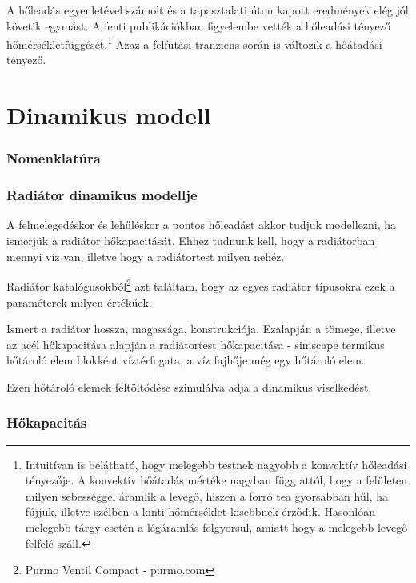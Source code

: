A hőleadás egyenletével számolt és a tapasztalati úton kapott eredmények elég jól követik egymást.
A fenti publikációkban figyelembe vették a hőleadási tényező hőmérsékletfüggését.\footnote{Intuitívan is belátható, hogy melegebb testnek nagyobb a konvektív hőleadási tényezője. A konvektív hőátadás mértéke nagyban függ attól, hogy a felületen milyen sebességgel áramlik a levegő, hiszen a forró tea gyorsabban hűl, ha fújjuk, illetve szélben a kinti hőmérséklet kisebbnek érződik. Hasonlóan melegebb tárgy esetén a légáramlás felgyorsul, amiatt hogy a melegebb levegő felfelé száll.} %
Azaz a felfutási tranziens során is változik a hőátadási tényező.



\section{Dinamikus modell}

\subsubsection*{Nomenklatúra}

\subsubsection{Radiátor dinamikus modellje}

A felmelegedéskor és lehűléskor a pontos hőleadást akkor tudjuk modellezni, ha ismerjük a radiátor hőkapacitását. Ehhez tudnunk kell, hogy a radiátorban mennyi víz van, illetve hogy a radiátortest milyen nehéz.

Radiátor katalógusokból\footnote{Purmo Ventil Compact - purmo.com} azt találtam, hogy az egyes radiátor típusokra ezek a paraméterek milyen értékűek.

Ismert a radiátor hossza, magassága, konstrukciója. Ezalapján a
tömege, illetve az acél hőkapacitása alapján a radiátortest hőkapacitása - simscape termikus hőtároló elem blokként
víztérfogata, a víz fajhője még egy hőtároló elem.

Ezen hőtároló elemek feltöltődése szimulálva adja a dinamikus viselkedést.


\subsubsection{Hőkapacitás}

